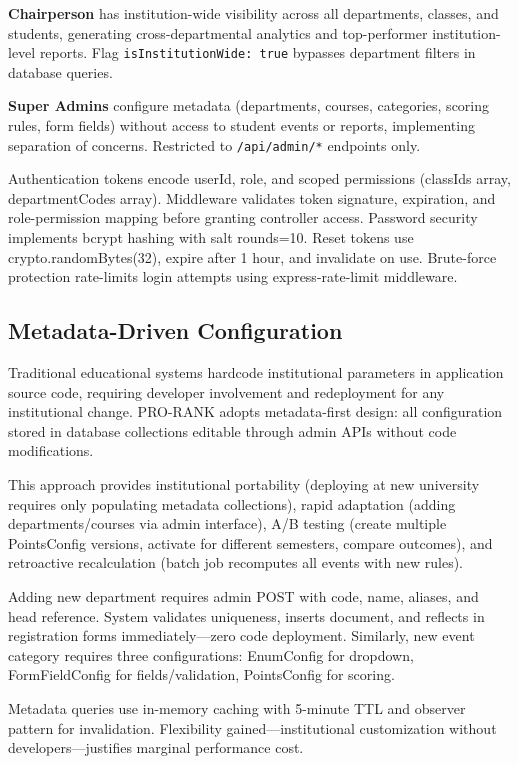 \documentclass[conference]{IEEEtran}
\begin{document}
\textbf{Chairperson} has institution-wide visibility across all departments, classes, and students, generating cross-departmental analytics and top-performer institution-level reports. Flag \texttt{isInstitutionWide: true} bypasses department filters in database queries.

\textbf{Super Admins} configure metadata (departments, courses, categories, scoring rules, form fields) without access to student events or reports, implementing separation of concerns. Restricted to \texttt{/api/admin/*} endpoints only.

Authentication tokens encode userId, role, and scoped permissions (classIds array, departmentCodes array). Middleware validates token signature, expiration, and role-permission mapping before granting controller access. Password security implements bcrypt hashing with salt rounds=10. Reset tokens use crypto.randomBytes(32), expire after 1 hour, and invalidate on use. Brute-force protection rate-limits login attempts using express-rate-limit middleware.

\subsection{Metadata-Driven Configuration}
Traditional educational systems hardcode institutional parameters in application source code, requiring developer involvement and redeployment for any institutional change. PRO-RANK adopts metadata-first design: all configuration stored in database collections editable through admin APIs without code modifications.

This approach provides institutional portability (deploying at new university requires only populating metadata collections), rapid adaptation (adding departments/courses via admin interface), A/B testing (create multiple PointsConfig versions, activate for different semesters, compare outcomes), and retroactive recalculation (batch job recomputes all events with new rules).

Adding new department requires admin POST with code, name, aliases, and head reference. System validates uniqueness, inserts document, and reflects in registration forms immediately—zero code deployment. Similarly, new event category requires three configurations: EnumConfig for dropdown, FormFieldConfig for fields/validation, PointsConfig for scoring.

Metadata queries use in-memory caching with 5-minute TTL and observer pattern for invalidation. Flexibility gained—institutional customization without developers—justifies marginal performance cost.
\end{document}

